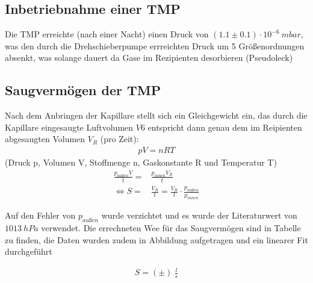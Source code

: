 \documentclass[12pt, a4paper]{scrartcl}
\begin{document}
    \subsection{Inbetriebnahme einer TMP}
    
        Die TMP erreichte (nach einer Nacht) einen Druck von 
        $(1.1\pm 0.1)\cdot10^{-6}\ mbar$, 
        was den durch die Drehschieberpumpe errreichten Druck um 5
        Größenordnungen absenkt, was solange dauert da Gase im Rezipienten desorbieren (Pseudoleck)
        
    \subsection{Saugvermögen der TMP}
        
        Nach dem Anbringen der Kapillare stellt sich ein Gleichgewicht ein, das durch die Kapillare eingesaugte Luftvolumen $V6$ entspricht dann genau dem im Reipienten abgesaugten Volumen $V_R$ (pro Zeit):
        \begin{align}
            pV=nRT
        \end{align}
        (Druck p, Volumen V, Stoffmenge n, Gaskonstante R und Temperatur T)
        \begin{align}
            \frac{p_{außen}V}{t} =& \frac{p_{innen}V_R}{t}\\
            \Leftrightarrow S=&\frac{V_R}{t}=\frac{V_R}{t}\cdot \frac{p_{außen}}{p_{innen}}
        \end{align}
	
        Auf den Fehler von $p_{außen}$ wurde verzichtet und es wurde der Literaturwert von $1013\ hPa$ verwendet.
        Die errechneten Wee für das Saugvermögen sind in Tabelle
        zu finden, die Daten wurden zudem in Abbildung
        aufgetragen und ein linearer Fit durchgeführt
        
        \begin{align*}
            S=(\pm)\ \frac{l}{s}
        \end{align*}
        
\end{document}
